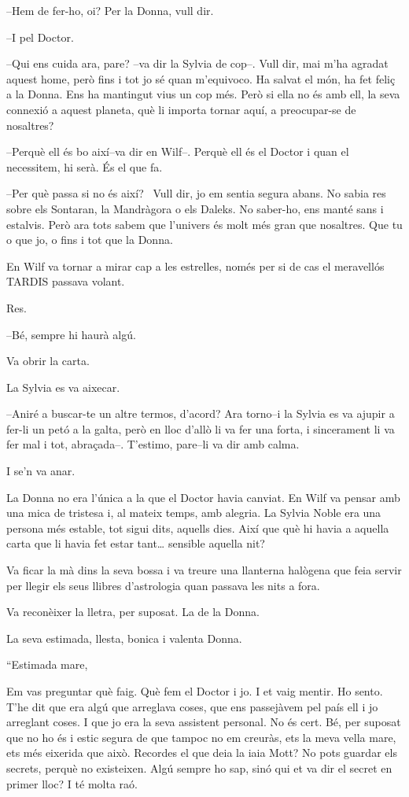 --Hem de fer-ho, oi? Per la Donna, vull dir.

--I pel Doctor.

--Qui ens cuida ara, pare? --va dir la Sylvia de cop--. Vull dir, mai
m'ha agradat aquest home, però fins i tot jo sé quan m'equivoco. Ha
salvat el món, ha fet feliç a la Donna. Ens ha mantingut vius un cop
més. Però si ella no és amb ell, la seva connexió a aquest planeta, què
li importa tornar aquí, a preocupar-se de nosaltres?

--Perquè ell és bo així--va dir en Wilf--. Perquè ell és el Doctor i
quan el necessitem, hi serà. És el que fa.

--Per què passa si no és així? ~Vull dir, jo em sentia segura abans. No
sabia res sobre els Sontaran, la Mandràgora o els Daleks. No saber-ho,
ens manté sans i estalvis. Però ara tots sabem que l'univers és molt més
gran que nosaltres. Que tu o que jo, o fins i tot que la Donna.

En Wilf va tornar a mirar cap a les estrelles, només per si de cas el
meravellós TARDIS passava volant.

Res.

--Bé, sempre hi haurà algú.

Va obrir la carta.

La Sylvia es va aixecar.

--Aniré a buscar-te un altre termos, d'acord? Ara torno--i la Sylvia es
va ajupir a fer-li un petó a la galta, però en lloc d'allò li va fer una
forta, i sincerament li va fer mal i tot, abraçada--. T'estimo, pare--li
va dir amb calma.

I se'n va anar.

La Donna no era l'única a la que el Doctor havia canviat. En Wilf va
pensar amb una mica de tristesa i, al mateix temps, amb alegria. La
Sylvia Noble era una persona més estable, tot sigui dits, aquells dies.
Així que què hi havia a aquella carta que li havia fet estar
tant\ldots{} sensible aquella nit?

Va ficar la mà dins la seva bossa i va treure una llanterna halògena que
feia servir per llegir els seus llibres d'astrologia quan passava les
nits a fora.

Va reconèixer la lletra, per suposat. La de la Donna.

La seva estimada, llesta, bonica i valenta Donna.

``Estimada mare,

Em vas preguntar què faig. Què fem el Doctor i jo. I et vaig mentir. Ho
sento. T'he dit que era algú que arreglava coses, que ens passejàvem pel
país ell i jo arreglant coses. I que jo era la seva assistent personal.
No és cert. Bé, per suposat que no ho és i estic segura de que tampoc no
em creuràs, ets la meva vella mare, ets més eixerida que això. Recordes
el que deia la iaia Mott? No pots guardar els secrets, perquè no
existeixen. Algú sempre ho sap, sinó qui et va dir el secret en primer
lloc? I té molta raó.

